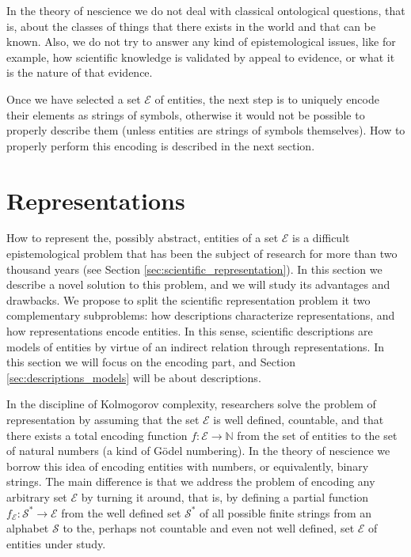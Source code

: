 In the theory of nescience we do not deal with classical ontological questions, that is, about the classes of things that there exists in the world and that can be known. Also, we do not try to answer any kind of epistemological issues, like for example, how scientific knowledge is validated by appeal to evidence, or what it is the nature of that evidence.

Once we have selected a set $\mathcal{E}$ of entities, the next step is to uniquely encode their elements as strings of symbols, otherwise it would not be possible to properly describe them (unless entities are strings of symbols themselves). How to properly perform this encoding is described in the next section.

%
%

\section{Representations}
\label{sec:representations}

How to represent the, possibly abstract, entities of a set $\mathcal{E}$ is a difficult epistemological problem that has been the subject of research for more than two thousand years (see Section \ref{sec:scientific_representation}). In this section we describe a novel solution to this problem, and we will study its advantages and drawbacks. We propose to split the scientific representation problem it two complementary subproblems: how descriptions characterize representations, and how representations encode entities. In this sense, scientific descriptions are models of entities by virtue of an indirect relation through representations. In this section we will focus on the encoding part, and Section \ref{sec:descriptions_models} will be about descriptions.

In the discipline of Kolmogorov complexity, researchers solve the problem of representation by assuming that the set $\mathcal{E}$ is well defined, countable, and that there exists a total encoding function $f:\mathcal{E} \rightarrow \mathbb{N}$ from the set of entities to the set of natural numbers (a kind of Gödel numbering). In the theory of nescience we borrow this idea of encoding entities with numbers, or equivalently, binary strings. The main difference is that we address the problem of encoding any arbitrary set $\mathcal{E}$ by turning it around, that is, by defining a partial function $f_\mathcal{E}:\mathcal{S}^\ast \rightarrow \mathcal{E}$ from the well defined set $\mathcal{S}^\ast$ of all possible finite strings from an alphabet $\mathcal{S}$ to the, perhaps not countable and even not well defined, set $\mathcal{E}$ of entities under study.


